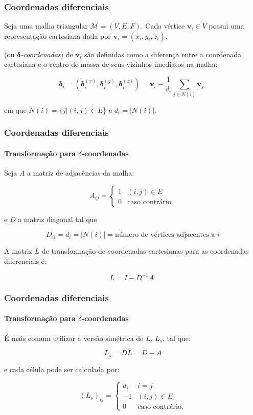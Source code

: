 \begin{frame}
\frametitle{Coordenadas diferenciais}

Seja uma malha triangular $\mathcal{M} = (V, E, F)$. Cada vértice $\mathbf{v}_i \in V$ possui uma representação cartesiana dada por $\mathbf{v}_i = (x_i,y_i,z_i)$.

\medskip

 (ou $\mathbf{\delta}$\textit{-coordenadas}) de $\mathbf{v}_i$ são definidas como a diferença entre a coordenada cartesiana e o centro de massa de seus vizinhos imediatos na malha:

\begin{equation}
	\mathbf{\delta}_i = (\mathbf{\delta}_i^{(x)}, \mathbf{\delta}_i^{(y)}, \mathbf{\delta}_i^{(z)}) = \mathbf{v}_i - \frac{1}{d_i} \sum_{j \in N(i)} \mathbf{v}_j,
	\label{eq_delta}
\end{equation}

\noindent em que $N(i) = \{j|(i,j) \in E$\} e $d_i = |N(i)|$.

\end{frame}

\begin{frame}
\frametitle{Coordenadas diferenciais}
\framesubtitle{Transformação para $\delta$-coordenadas}

Seja $A$ a matriz de adjacências da malha:

$$
A_{ij} = \begin{cases}
	1&(i, j) \in E\\
	0&\text{caso contrário.}
\end{cases}
$$

e $D$ a matriz diagonal tal que

$$D_{ii} = d_{i} = |N(i)| = \text{número de vértices adjacentes a }i$$

A matriz $L$ de transformação de coordenadas cartesianas para as coordenadas diferenciais é:

\begin{equation}
	L = I - D^{-1}A.
\end{equation}

\end{frame}

\begin{frame}
\frametitle{Coordenadas diferenciais}
\framesubtitle{Transformação para $\delta$-coordenadas}

É mais comum utilizar a versão simétrica de $L$, $L_s$, tal que:

$$L_s = DL = D - A$$

e cada célula pode ser calculada por:

\begin{equation}
	(L_s)_{ij} = \begin{cases}
		d_i&i=j\\
		-1&(i, j) \in E\\
		0&\text{caso contrário.}
	\end{cases}
\end{equation}


\end{frame}

